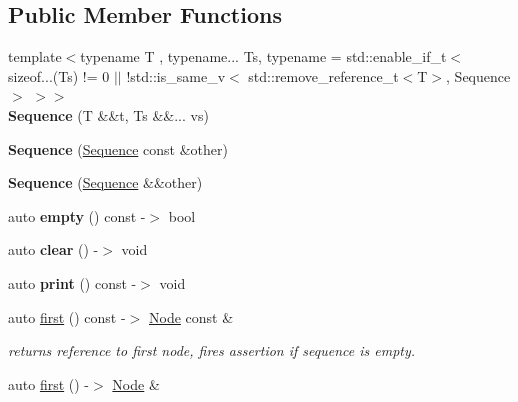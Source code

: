 \subsection*{Public Member Functions}
\begin{DoxyCompactItemize}
\item 
\mbox{\label{structSequence_a459306d4e8bad4783d046fd915a29428}} 
{\footnotesize template$<$typename T , typename... Ts, typename  = std\+::enable\+\_\+if\+\_\+t$<$                  sizeof...(\+Ts) != 0 $\vert$$\vert$ !std\+::is\+\_\+same\+\_\+v$<$                      std\+::remove\+\_\+reference\+\_\+t$<$\+T$>$,                      Sequence                      $>$                  $>$$>$ }\\{\bfseries Sequence} (T \&\&t, Ts \&\&... vs)
\item 
\mbox{\label{structSequence_a5a20017c4e6f6b7f91d6253e3c1008a3}} 
{\bfseries Sequence} (\mbox{\hyperlink{structSequence}{Sequence}} const \&other)
\item 
\mbox{\label{structSequence_a1faabdfa3061449a21c8c2c7a1ad46bc}} 
{\bfseries Sequence} (\mbox{\hyperlink{structSequence}{Sequence}} \&\&other)
\item 
\mbox{\label{structSequence_a0bc7ff94994dbaddf8e347067f23674c}} 
auto {\bfseries empty} () const -\/$>$ bool
\item 
\mbox{\label{structSequence_a0d75317da995bdc9ff5e381d9a5f16b0}} 
auto {\bfseries clear} () -\/$>$ void
\item 
\mbox{\label{structSequence_ae9fe93c38fd9801a1596ed7b88423df7}} 
auto {\bfseries print} () const -\/$>$ void
\item 
auto \mbox{\hyperlink{structSequence_a4cf528c57999936c6ca10d838d709787}{first}} () const -\/$>$ \mbox{\hyperlink{structSequence_1_1Node}{Node}} const \&
\begin{DoxyCompactList}\small\item\em returns reference to first node, fires assertion if sequence is empty. \end{DoxyCompactList}\item 
auto \mbox{\hyperlink{structSequence_a0e44c4e84595f40ac01f827a25a9aa65}{first}} () -\/$>$ \mbox{\hyperlink{structSequence_1_1Node}{Node}} \&

\end{DoxyCompactItemize}
